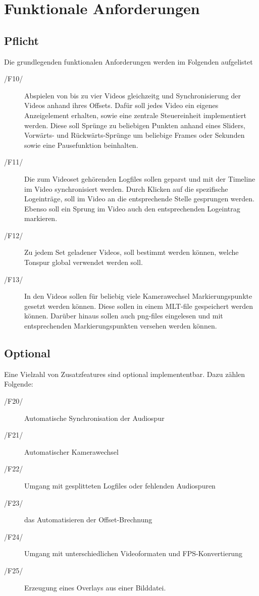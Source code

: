 \chapter{Funktionale Anforderungen}

    \section{Pflicht}
    Die grundlegenden funktionalen Anforderungen werden im Folgenden aufgelistet
    \begin{description}
        \item [/F10/] Abspielen von bis zu vier Videos gleichzeitg und Synchronisierung der Videos anhand ihres Offsets. Dafür soll jedes Video ein eigenes Anzeigelement erhalten, sowie eine zentrale Steuereinheit implementiert werden. Diese soll Sprünge zu beliebigen Punkten anhand eines Sliders, Vorwärts- und Rückwärts-Sprünge um beliebige Frames oder Sekunden sowie eine Pausefunktion beinhalten.
        \item [/F11/] Die zum Videoset gehörenden Logfiles sollen geparst und mit der Timeline im Video synchronisiert werden. Durch Klicken auf die spezifische Logeinträge, soll im Video an die entsprechende Stelle gesprungen werden. Ebenso soll ein Sprung im Video auch den entsprechenden Logeintrag markieren.
        \item [/F12/] Zu jedem Set geladener Videos, soll bestimmt werden können, welche Tonspur global verwendet werden soll.
        \item [/F13/] In den Videos sollen für beliebig viele Kamerawechsel Markierungspunkte gesetzt werden können. Diese sollen in einem MLT-file gespeichert werden können. Darüber hinaus sollen auch png-files eingelesen und mit entsprechenden Markierungspunkten versehen werden können.
    \end{description}

    \section{Optional}
    Eine Vielzahl von Zusatzfeatures sind optional implemententbar. Dazu zählen Folgende:
    \begin{description}
        \item [/F20/] Automatische Synchronisation der Audiospur
        \item [/F21/] Automatischer Kamerawechsel
        \item [/F22/] Umgang mit gesplitteten Logfiles oder fehlenden Audiospuren
        \item [/F23/] das Automatisieren der Offset-Brechnung
        \item [/F24/] Umgang mit unterschiedlichen Videoformaten und FPS-Konvertierung
        \item [/F25/] Erzeugung eines Overlays aus einer Bilddatei.
    \end{description}
    
